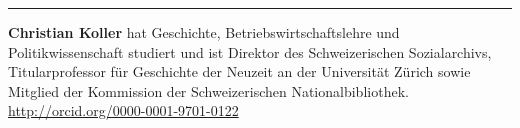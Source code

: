 \begin{center}\rule{0.5\linewidth}{\linethickness}\end{center}

\textbf{Christian Koller} hat Geschichte, Betriebswirtschaftslehre und
Politikwissenschaft studiert und ist Direktor des Schweizerischen
Sozialarchivs, Titularprofessor für Geschichte der Neuzeit an der
Universität Zürich sowie Mitglied der Kommission der Schweizerischen
Nationalbibliothek. \url{http://orcid.org/0000-0001-9701-0122}
